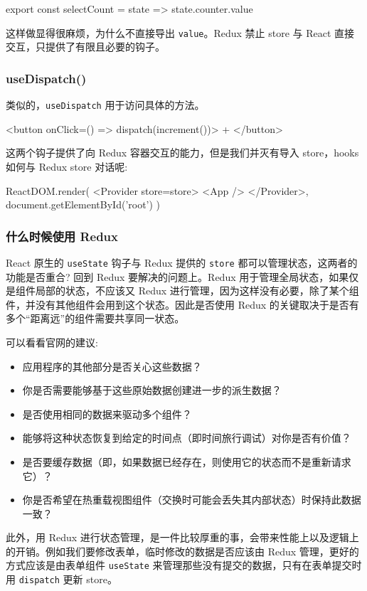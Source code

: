 \begin{JavaScript}
export const selectCount = state => state.counter.value
\end{JavaScript}

这样做显得很麻烦，为什么不直接导出 \texttt{value}。Redux 禁止 store 与 React 直接交互，只提供了有限且必要的钩子。

\subsubsection*{useDispatch()}

类似的，\texttt{useDispatch} 用于访问具体的方法。

\begin{JavaScript}
<button onClick={() => dispatch(increment())}>
  +
</button>
\end{JavaScript}

这两个钩子提供了向 Redux 容器交互的能力，但是我们并灭有导入 store，hooks 如何与 Redux store 对话呢:

\begin{JavaScript}
ReactDOM.render(
  <Provider store={store}>
    <App />
  </Provider>,
  document.getElementById('root')
)
\end{JavaScript}

\subsubsection{什么时候使用 Redux}

React 原生的 \texttt{useState} 钩子与 Redux 提供的 \texttt{store} 都可以管理状态，这两者的功能是否重合? 回到 Redux 要解决的问题上。Redux 用于管理全局状态，如果仅是组件局部的状态，不应该又 Redux 进行管理，因为这样没有必要，除了某个组件，并没有其他组件会用到这个状态。因此是否使用 Redux 的关键取决于是否有多个``距离远''的组件需要共享同一状态。

可以看看官网的建议:
\begin{itemize}
  \item 应用程序的其他部分是否关心这些数据？
  \item 你是否需要能够基于这些原始数据创建进一步的派生数据？
  \item 是否使用相同的数据来驱动多个组件？
  \item 能够将这种状态恢复到给定的时间点（即时间旅行调试）对你是否有价值？
  \item 是否要缓存数据（即，如果数据已经存在，则使用它的状态而不是重新请求它）？
  \item 你是否希望在热重载视图组件（交换时可能会丢失其内部状态）时保持此数据一致？
\end{itemize}

此外，用 Redux 进行状态管理，是一件比较厚重的事，会带来性能上以及逻辑上的开销。例如我们要修改表单，临时修改的数据是否应该由 Redux 管理，更好的方式应该是由表单组件 \texttt{useState} 来管理那些没有提交的数据，只有在表单提交时用 \texttt{dispatch} 更新 store。